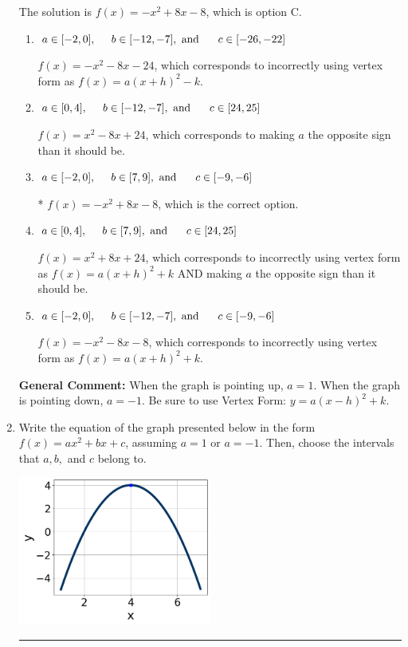 \documentclass{extbook}[14pt]
\newcommand{\litem}[1]{\item #1

\rule{\textwidth}{0.4pt}}
\begin{document}
\begin{enumerate}
{The solution is \( f(x) = -x^{2} +8 x -8 \), which is option C.\begin{enumerate}[label=\Alph*.]
\item \( a \in [-2, 0], \hspace*{5mm} b \in [-12, -7], \text{ and } \hspace*{5mm} c \in [-26, -22] \)

$f(x)=-x^{2} -8 x -24$, which corresponds to incorrectly using vertex form as $f(x) = a(x+h)^2 - k$.
\item \( a \in [0, 4], \hspace*{5mm} b \in [-12, -7], \text{ and } \hspace*{5mm} c \in [24, 25] \)

$f(x)=x^{2} -8 x + 24$, which corresponds to making $a$ the opposite sign than it should be.
\item \( a \in [-2, 0], \hspace*{5mm} b \in [7, 9], \text{ and } \hspace*{5mm} c \in [-9, -6] \)

* $f(x)=-x^{2} +8 x -8$, which is the correct option.
\item \( a \in [0, 4], \hspace*{5mm} b \in [7, 9], \text{ and } \hspace*{5mm} c \in [24, 25] \)

$f(x)=x^{2} +8 x + 24$, which corresponds to incorrectly using vertex form as $f(x) = a(x+h)^2+k$ AND making $a$ the opposite sign than it should be.
\item \( a \in [-2, 0], \hspace*{5mm} b \in [-12, -7], \text{ and } \hspace*{5mm} c \in [-9, -6] \)

$f(x)=-x^{2} -8 x -8$, which corresponds to incorrectly using vertex form as $f(x) = a(x+h)^2+k$.
\end{enumerate}

\textbf{General Comment:} When the graph is pointing up, $a=1$. When the graph is pointing down, $a=-1$. Be sure to use Vertex Form: $y = a(x-h)^2+k$.
}
\litem{
Write the equation of the graph presented below in the form $f(x)=ax^2+bx+c$, assuming  $a=1$ or $a=-1$. Then, choose the intervals that $a, b,$ and $c$ belong to.

\begin{center}
    \includegraphics[width=0.5\textwidth]{../Figures/quadraticGraphToEquationCopyC.png}
\end{center}


}
\end{enumerate}
\end{document}
